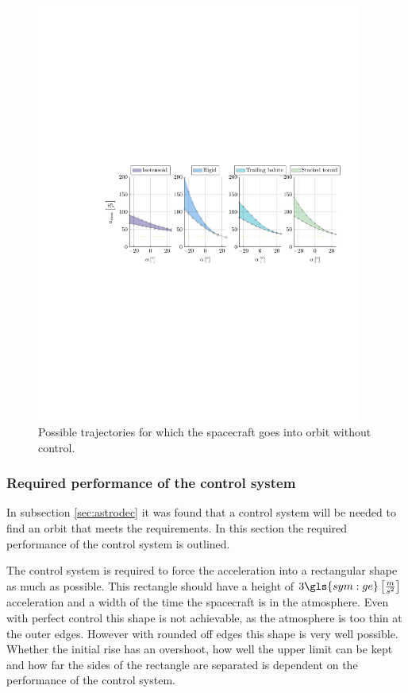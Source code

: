 \begin{figure}[h]
	\centering
	\includegraphics[trim={4.25cm 10.5cm 1cm 10.5cm},clip,width=0.95\textwidth]{Figure/orbital_model/n_alpha.pdf}
	\caption{Possible trajectories for which the spacecraft goes into orbit without control.}
	\label{fig:n_alpha}
\end{figure}

\subsubsection{Required performance of the control system}
\label{sec:astroperfomance}

In subsection \ref{sec:astrodec} it was found that a control system will be needed to find an orbit that meets the requirements. In this section the required performance of the control system is outlined.

The control system is required to force the acceleration into a rectangular shape as much as possible. This rectangle should have a height of $3 \gls{sym:ge} \left[\frac{m}{s^2}\right]$ acceleration and a width of the time the spacecraft is in the atmosphere. Even with perfect control this shape is not achievable, as the atmosphere is too thin at the outer edges. However with rounded off edges this shape is very well possible. Whether the initial rise has an overshoot, how well the upper limit can be kept and how far the sides of the rectangle are separated is dependent on the performance of the control system.

